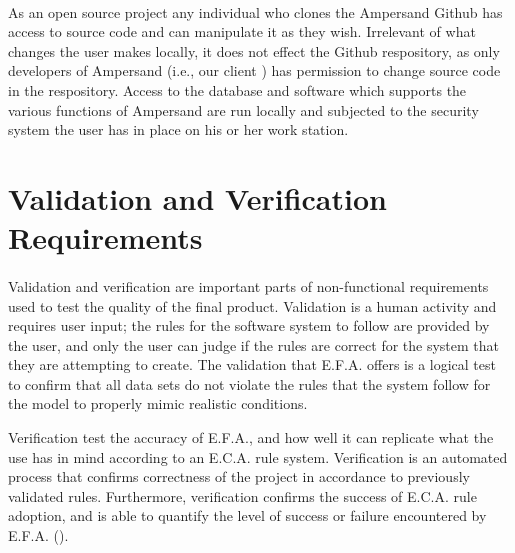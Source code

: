 \documentclass[12pt]{report}
\begin{document}
\paragraph*{}
As an open source project any individual who clones the Ampersand Github has access to source code 
and can manipulate it as they wish. Irrelevant of what changes the user makes locally, it does not 
effect the Github respository, as only developers of Ampersand \big(i.e., our client \big) has 
permission to change source code in the respository. Access to the database and software which 
supports the various functions of Ampersand are run locally and subjected to the security system 
the user has in place on his or her work station.

\section{Validation and Verification Requirements}\label{sec:Verification}

\paragraph*{}
Validation and verification are important parts of non-functional requirements used to test the 
quality of the final product. Validation is a human activity and requires user input; the rules for 
the software system to follow are provided by the user, and only the user can judge if the rules 
are correct for the system that they are attempting to create. The validation that E.F.A. offers is 
a logical test to confirm that all data sets do not violate the rules that the system follow for 
the model to properly mimic realistic conditions. 

Verification test the accuracy of E.F.A., and how well it can replicate what the use has in mind 
according to an E.C.A. rule system. Verification is an automated process that confirms correctness 
of the project in accordance to previously validated rules. Furthermore, verification confirms the 
success of E.C.A. rule adoption, and is able to quantify the level of success or failure 
encountered by E.F.A. (\cite{RBD}). 
\end{document}
